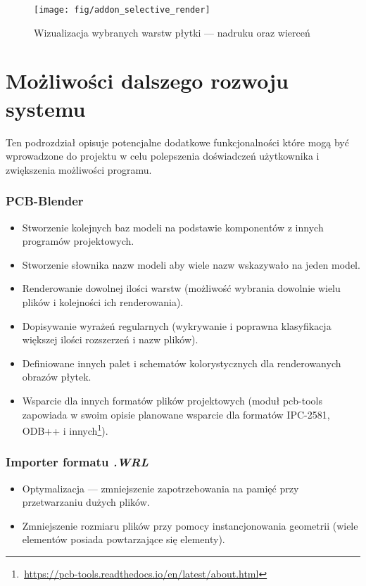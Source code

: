 \documentclass{xmgr}
\begin{document}
\begin{figure}
\centering
\texttt{[image: fig/addon\_selective\_render]}
\caption{Wizualizacja wybranych warstw płytki --- nadruku oraz wierceń}
 \label{img3}
\end{figure}


\section{Możliwości dalszego rozwoju systemu}
Ten podrozdział opisuje potencjalne dodatkowe funkcjonalności które mogą być wprowadzone do projektu w celu polepszenia doświadczeń użytkownika i zwiększenia możliwości programu.

\subsubsection{PCB-Blender}
\begin{itemize}
\item Stworzenie kolejnych baz modeli na podstawie komponentów z innych programów projektowych.
\item Stworzenie słownika nazw modeli aby wiele nazw wskazywało na jeden model.
\item Renderowanie dowolnej ilości warstw (możliwość wybrania dowolnie wielu plików i kolejności ich renderowania).
\item Dopisywanie wyrażeń regularnych (wykrywanie i poprawna klasyfikacja większej ilości rozszerzeń i nazw plików).
\item Definiowane innych palet i schematów kolorystycznych dla renderowanych obrazów płytek.
\item Wsparcie dla innych formatów plików projektowych (moduł pcb-tools zapowiada w swoim opisie planowane wsparcie dla formatów IPC-2581, ODB++ i innych\footnote{\,\url{https://pcb-tools.readthedocs.io/en/latest/about.html}}).
\end{itemize}

\subsubsection{Importer formatu \emph{.WRL}}
\begin{itemize}
\item Optymalizacja --- zmniejszenie zapotrzebowania na pamięć przy przetwarzaniu dużych plików.
\item Zmniejszenie rozmiaru plików przy pomocy instancjonowania geometrii (wiele elementów posiada powtarzające się elementy).
\end{itemize}
\end{document}
